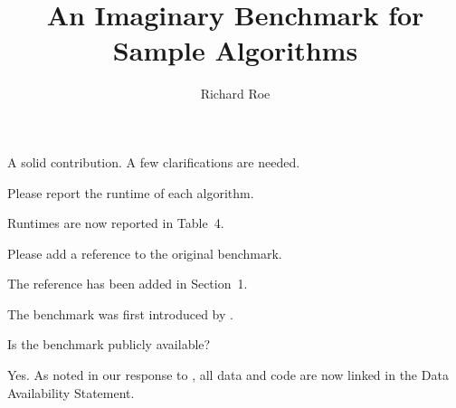 \documentclass[11pt,final,greyscale,compact,plainnumbers,noautothanks]{authorresponseletter}
\title{An Imaginary Benchmark for Sample Algorithms}
\author{Richard Roe}
\begin{document}
\maketitle

\reviewer

\begin{generalcomment}
A solid contribution. A few clarifications are needed.
\end{generalcomment}
\begin{generalresponse}
\end{generalresponse}

\begin{revcomment}
\label{r1:c1}
Please report the runtime of each algorithm.
\end{revcomment}
\begin{revresponse}
Runtimes are now reported in Table~4.
\end{revresponse}

\begin{revcomment}
Please add a reference to the original benchmark.
\end{revcomment}
\begin{revresponse}
The reference has been added in Section~1.
\begin{revision}[Section 1, p.~2]
The benchmark was first introduced by  .
\end{revision}
\end{revresponse}

\reviewer

\begin{revcomment}
Is the benchmark publicly available?
\end{revcomment}
\begin{revresponse}
Yes. As noted in our response to , all data and code are now linked in the Data Availability Statement.
\end{revresponse}
\end{document}
